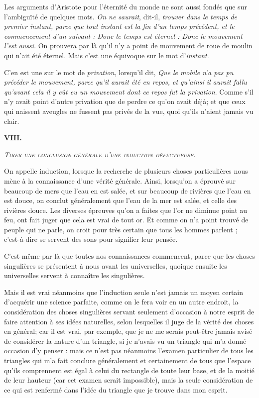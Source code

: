 Les arguments d'Aristote pour l'éternité du monde ne sont aussi fondés que sur l'ambiguïté de quelques mots. \emph{On ne saurait}, dit-il, \emph{trouver dans le temps de premier instant, parce que tout instant est la fin d'un temps précédent, et le commencement d'un suivant : Donc le temps est éternel : Donc le mouvement l'est aussi}. On prouvera par là qu'il n'y a point de mouvement de roue de moulin qui n'ait été éternel. Mais c'est une équivoque sur le mot d'\emph{instant}.

C'en est une sur le mot de \emph{privation}, lorsqu'il dit, \emph{Que le mobile n'a pas pu précéder le mouvement, parce qu'il aurait été en repos, et qu'ainsi il aurait fallu qu'avant cela il y eût eu un mouvement dont ce repos fut la privation}. Comme s'il n'y avait point d'autre privation que de perdre ce qu'on avait déjà; et que ceux qui naissent aveugles ne fussent pas privés de la vue, quoi qu'ils n'aient jamais vu clair.


\begin{center}{\bfseries\large VIII.}\end{center}
\begin{center}\emph{\scshape Tirer une conclusion générale d'une induction défectueuse.}\end{center}

On appelle induction, lorsque la recherche de plusieurs choses particulières nous mène à la connaissance d'une vérité générale. Ainsi, lorsqu'on a éprouvé sur beaucoup de mers que l'eau en est salée, et sur beaucoup de rivières que l'eau en est douce, on conclut généralement que l'eau de la mer est salée, et celle des rivières douce. Les diverses épreuves qu'on a faites que l'or ne diminue point au feu, ont fait juger que cela est vrai de tout or. Et comme on n'a point trouvé de peuple qui ne parle, on croit pour très certain que tous les hommes parlent ; c'est-à-dire se servent des sons pour signifier leur pensée.

C'est même par là que toutes nos connaissances commencent, parce que les choses singulières se présentent à nous avant les universelles, quoique ensuite les universelles servent à connaître les singulières.

Mais il est vrai néanmoins que l'induction seule n'est jamais un moyen certain d'acquérir une science parfaite, comme on le fera voir en un autre endroit, la considération des choses singulières servant seulement d'occasion à notre esprit de faire attention à ses idées naturelles, selon lesquelles il juge de la vérité des choses en général; car il est vrai, par exemple, que je ne me serais peut-être jamais avisé de considérer la nature d'un triangle, si je n'avais vu un triangle qui m'a donné occasion d'y penser : mais ce n'est pas néanmoins l'examen particulier de tous les triangles qui m'a fait conclure généralement et certainement de tous que l'espace qu'ils comprennent est égal à celui du rectangle de toute leur base, et de la moitié de leur hauteur (car cet examen serait impossible), mais la seule considération de ce qui est renfermé dans l'idée du triangle que je trouve dans mon esprit.

